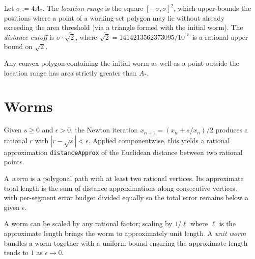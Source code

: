 \begin{definition}
  \label{def:locationRange}
  \leanok
  Let $\sigma := 4 A_*$. The \emph{location range} is the square
  $[-\sigma, \sigma]^2$, which upper-bounds the positions where a point of
  a working-set polygon may lie without already exceeding the area
  threshold (via a triangle formed with the initial worm). The
  \emph{distance cutoff} is $\sigma \cdot \overline{\sqrt{2}}$, where
  $\overline{\sqrt{2}} = 1414213562373095/10^{15}$ is a rational upper
  bound on $\sqrt 2$.
\end{definition}

\begin{proposition}
  \label{prop:locationRange-excludes}
  Any convex polygon containing the initial worm as well as a point
  outside the location range has area strictly greater than $A_*$.
\end{proposition}

\chapter{Worms}

\begin{definition}
  \label{def:sqrtApprox}
  \leanok
  Given $s \ge 0$ and $\epsilon > 0$, the Newton iteration
  $x_{n+1} = (x_n + s/x_n)/2$ produces a rational $r$ with
  $|r - \sqrt{s}| < \epsilon$. Applied componentwise, this yields a
  rational approximation \texttt{distanceApprox} of the Euclidean distance
  between two rational points.
\end{definition}

\begin{definition}[Worm]
  \label{def:worm}
  \leanok
  A \emph{worm} is a polygonal path with at least two rational vertices.
  Its approximate total length is the sum of distance approximations along
  consecutive vertices, with per-segment error budget divided equally so
  the total error remains below a given $\epsilon$.
\end{definition}

\begin{definition}
  \label{def:scaleToUnit}
  A worm can be scaled by any rational factor; scaling by $1/\ell$ where
  $\ell$ is the approximate length brings the worm to approximately unit
  length. A \emph{unit worm} bundles a worm together with a uniform bound
  ensuring the approximate length tends to $1$ as $\epsilon \to 0$.
\end{definition}

